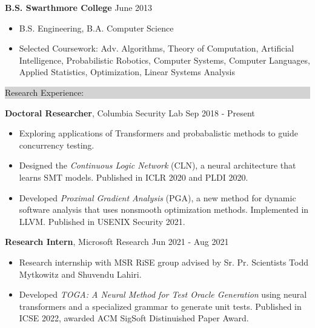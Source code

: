 \documentclass{article} %
\newcommand{\rsection}[1]{
  \hspace{-0.4cm}\vspace{0.1cm}
\colorbox{lightgrey}{
\begin{minipage}{1.07\linewidth}
\vspace{0.22cm}
\fontsize{14pt}{16pt}\selectfont #1
\vspace{0.12cm}
\end{minipage}
}
\vspace*{-0.1cm}
}
\newcommand{\rjob}[2]{
  \hspace*{-0.3cm}
{\fontsize{10pt}{12pt}\selectfont #1} \hfill #2
\vspace*{0.1cm}
\hspace*{-1.2cm}
}
\newenvironment{ritemize}{
\hspace*{-0.8cm}
\begin{minipage}{1.05\linewidth}
\begin{itemize}
}{
\end{itemize}
\end{minipage}
}
\newcommand{\ritem}{
\item[-]
}
\begin{document}
\rjob{\textbf{B.S. Swarthmore College}}{June 2013}\\
\begin{ritemize}
    \ritem B.S. Engineering, B.A. Computer Science %
\ritem Selected Coursework: Adv. Algorithms, Theory of Computation, Artificial Intelligence, Probabilistic Robotics, Computer Systems, Computer Languages, Applied Statistics, Optimization, Linear Systems Analysis
\end{ritemize}
\vspace{0.25cm}



\rsection{Research Experience:}



\rjob{\textbf{Doctoral Researcher}, Columbia Security Lab}{Sep 2018 - Present}\\
\begin{ritemize}
    \ritem Exploring applications of Transformers and probabalistic methods to guide concurrency testing.
    \ritem Designed the \textit{Continuous Logic Network} (CLN), a neural architecture that learns SMT models. Published in ICLR 2020 and PLDI 2020.
  \ritem Developed \textit{Proximal Gradient Analysis} (PGA), a new method for dynamic software analysis that uses nonsmooth optimization methods. Implemented in LLVM. Published in USENIX Security 2021.
\end{ritemize}

\rjob{\textbf{Research Intern}, Microsoft Research}{Jun 2021 - Aug 2021}\\
\begin{ritemize}
    \ritem Research internship with MSR RiSE group advised by Sr. Pr. Scientists Todd Mytkowitz and Shuvendu Lahiri.
    \ritem Developed \textit{TOGA: A Neural Method for Test Oracle Generation} using neural transformers and a specialized grammar to generate unit tests. Published in ICSE 2022, awarded ACM SigSoft Distinuished Paper Award.
\end{ritemize}
\end{document}
